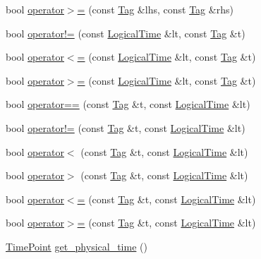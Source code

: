 \begin{DoxyCompactItemize}
\item 
bool \hyperlink{namespacereactor_a33339cac3268e44879ed753a397aec99}{operator$>$=} (const \hyperlink{classreactor_1_1Tag}{Tag} \&lhs, const \hyperlink{classreactor_1_1Tag}{Tag} \&rhs)
\item 
bool \hyperlink{namespacereactor_a127aac66cd5fa1913c6756d46be9d817}{operator!=} (const \hyperlink{classreactor_1_1LogicalTime}{Logical\+Time} \&lt, const \hyperlink{classreactor_1_1Tag}{Tag} \&t)
\item 
bool \hyperlink{namespacereactor_a601c2be55dc826bea9a245045613ccc5}{operator$<$=} (const \hyperlink{classreactor_1_1LogicalTime}{Logical\+Time} \&lt, const \hyperlink{classreactor_1_1Tag}{Tag} \&t)
\item 
bool \hyperlink{namespacereactor_aba36ee73a806348027f3a8468faa0dc4}{operator$>$=} (const \hyperlink{classreactor_1_1LogicalTime}{Logical\+Time} \&lt, const \hyperlink{classreactor_1_1Tag}{Tag} \&t)
\item 
bool \hyperlink{namespacereactor_a97c015047b9fb102d5b41e244da88917}{operator==} (const \hyperlink{classreactor_1_1Tag}{Tag} \&t, const \hyperlink{classreactor_1_1LogicalTime}{Logical\+Time} \&lt)
\item 
bool \hyperlink{namespacereactor_a084a8581290e7446f44cc2ca94c47fdf}{operator!=} (const \hyperlink{classreactor_1_1Tag}{Tag} \&t, const \hyperlink{classreactor_1_1LogicalTime}{Logical\+Time} \&lt)
\item 
bool \hyperlink{namespacereactor_acd3c1262138ace0007602d65740bc806}{operator$<$} (const \hyperlink{classreactor_1_1Tag}{Tag} \&t, const \hyperlink{classreactor_1_1LogicalTime}{Logical\+Time} \&lt)
\item 
bool \hyperlink{namespacereactor_ac9d3f8609a66fbbc8a4d375da18a14e2}{operator$>$} (const \hyperlink{classreactor_1_1Tag}{Tag} \&t, const \hyperlink{classreactor_1_1LogicalTime}{Logical\+Time} \&lt)
\item 
bool \hyperlink{namespacereactor_a187a8a69a9cd1edb808e7c92a7a944a0}{operator$<$=} (const \hyperlink{classreactor_1_1Tag}{Tag} \&t, const \hyperlink{classreactor_1_1LogicalTime}{Logical\+Time} \&lt)
\item 
bool \hyperlink{namespacereactor_adb34cd1dff4f0af83c099efae8c2f0cc}{operator$>$=} (const \hyperlink{classreactor_1_1Tag}{Tag} \&t, const \hyperlink{classreactor_1_1LogicalTime}{Logical\+Time} \&lt)
\item 
\hyperlink{namespacereactor_ad950f8d1a46612500286a4af0f167080}{Time\+Point} \hyperlink{namespacereactor_a49facd170b623937b3e655518a66b868}{get\+\_\+physical\+\_\+time} ()

\end{DoxyCompactItemize}
